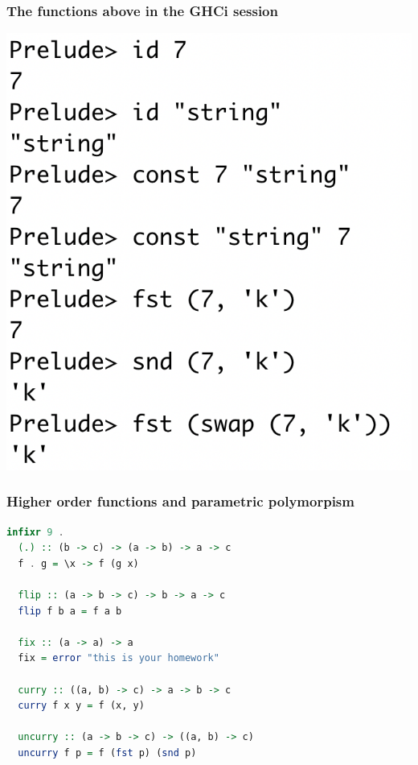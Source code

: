 \documentclass[10pt,pdf,utf8,russian,aspectratio=169]{beamer}
\begin{document}
\begin{frame}
  \frametitle{The functions above in the GHCi session}

  \begin{center}
  \includegraphics[scale=0.5]{Pics/Triv.png}
  \end{center}
\end{frame}

\begin{frame}[fragile]
  \frametitle{Higher order functions and parametric polymorpism}

  \begin{lstlisting}[language=Haskell]
  infixr 9 .
  (.) :: (b -> c) -> (a -> b) -> a -> c
  f . g = \x -> f (g x)

  flip :: (a -> b -> c) -> b -> a -> c
  flip f b a = f a b

  fix :: (a -> a) -> a
  fix = error "this is your homework"

  curry :: ((a, b) -> c) -> a -> b -> c
  curry f x y = f (x, y)

  uncurry :: (a -> b -> c) -> ((a, b) -> c)
  uncurry f p = f (fst p) (snd p)
  \end{lstlisting}
\end{frame}
\end{document}
